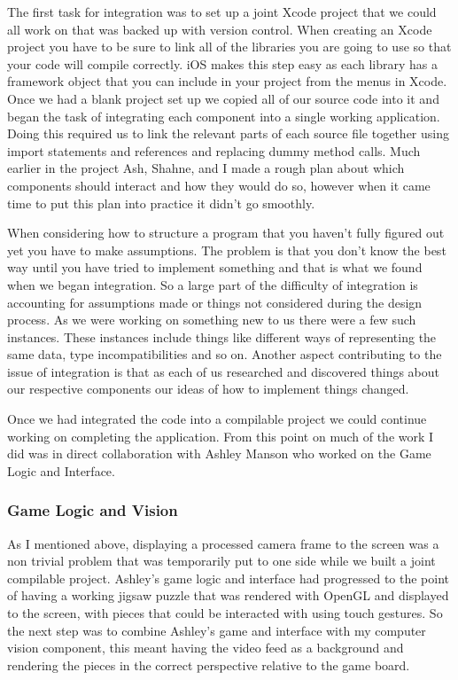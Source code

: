 \documentclass{article}
\begin{document}
The first task for integration was to set up a joint Xcode project that we could all work on that was backed up with version control. When creating an Xcode project you have to be sure to link all of the libraries you are going to use so that your code will compile correctly. iOS makes this step easy as each library has a framework object that you can include in your project from the menus in Xcode. Once we had a blank project set up we copied all of our source code into it and began the task of integrating each component into a single working application. Doing this required us to link the relevant parts of each source file together using import statements and references and replacing dummy method calls. Much earlier in the project Ash, Shahne, and I made a rough plan about which components should interact and how they would do so, however when it came time to put this plan into practice it didn't go smoothly. 

When considering how to structure a program that you haven't fully figured out yet you have to make assumptions. The problem is that you don't know the best way until you have tried to implement something and that is what we found when we began integration. So a large part of the difficulty of integration is accounting for assumptions made or things not considered during the design process. As we were working on something new to us there were a few such instances. These instances include things like different ways of representing the same data, type incompatibilities and so on. Another aspect contributing to the issue of integration is that as each of us researched and discovered things about our respective components our ideas of how to implement things changed.

Once we had integrated the code into a compilable project we could continue working on completing the application. From this point on much of the work I did was in direct collaboration with Ashley Manson who worked on the Game Logic and Interface. 

\subsubsection{Game Logic and Vision}






As I mentioned above, displaying a processed camera frame to the screen was a non trivial problem that was temporarily put to one side while we built a joint compilable project. Ashley's game logic and interface had progressed to the point of having a working jigsaw puzzle that was rendered with OpenGL and displayed to the screen, with pieces that could be interacted with using touch gestures. So the next step was to combine Ashley's game and interface with my computer vision component, this meant having the video feed as a background and rendering the pieces in the correct perspective relative to the game board. 
\end{document}
